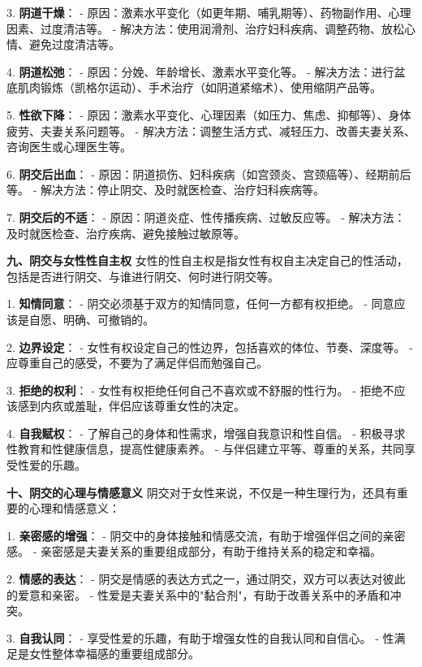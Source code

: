 \begin{enumerate}
  3. \textbf{阴道干燥}：
     - 原因：激素水平变化（如更年期、哺乳期等）、药物副作用、心理因素、过度清洁等。
     - 解决方法：使用润滑剂、治疗妇科疾病、调整药物、放松心情、避免过度清洁等。

  4. \textbf{阴道松弛}：
     - 原因：分娩、年龄增长、激素水平变化等。
     - 解决方法：进行盆底肌肉锻炼（凯格尔运动）、手术治疗（如阴道紧缩术）、使用缩阴产品等。

  5. \textbf{性欲下降}：
     - 原因：激素水平变化、心理因素（如压力、焦虑、抑郁等）、身体疲劳、夫妻关系问题等。
     - 解决方法：调整生活方式、减轻压力、改善夫妻关系、咨询医生或心理医生等。

  6. \textbf{阴交后出血}：
     - 原因：阴道损伤、妇科疾病（如宫颈炎、宫颈癌等）、经期前后等。
     - 解决方法：停止阴交、及时就医检查、治疗妇科疾病等。

  7. \textbf{阴交后的不适}：
     - 原因：阴道炎症、性传播疾病、过敏反应等。
     - 解决方法：及时就医检查、治疗疾病、避免接触过敏原等。

  \textbf{九、阴交与女性性自主权}
  女性的性自主权是指女性有权自主决定自己的性活动，包括是否进行阴交、与谁进行阴交、何时进行阴交等。

  1. \textbf{知情同意}：
     - 阴交必须基于双方的知情同意，任何一方都有权拒绝。
     - 同意应该是自愿、明确、可撤销的。

  2. \textbf{边界设定}：
     - 女性有权设定自己的性边界，包括喜欢的体位、节奏、深度等。
     - 应尊重自己的感受，不要为了满足伴侣而勉强自己。

  3. \textbf{拒绝的权利}：
     - 女性有权拒绝任何自己不喜欢或不舒服的性行为。
     - 拒绝不应该感到内疚或羞耻，伴侣应该尊重女性的决定。

  4. \textbf{自我赋权}：
     - 了解自己的身体和性需求，增强自我意识和性自信。
     - 积极寻求性教育和性健康信息，提高性健康素养。
     - 与伴侣建立平等、尊重的关系，共同享受性爱的乐趣。

  \textbf{十、阴交的心理与情感意义}
  阴交对于女性来说，不仅是一种生理行为，还具有重要的心理和情感意义：

  1. \textbf{亲密感的增强}：
     - 阴交中的身体接触和情感交流，有助于增强伴侣之间的亲密感。
     - 亲密感是夫妻关系的重要组成部分，有助于维持关系的稳定和幸福。

  2. \textbf{情感的表达}：
     - 阴交是情感的表达方式之一，通过阴交，双方可以表达对彼此的爱意和亲密。
     - 性爱是夫妻关系中的"黏合剂"，有助于改善关系中的矛盾和冲突。

  3. \textbf{自我认同}：
     - 享受性爱的乐趣，有助于增强女性的自我认同和自信心。
     - 性满足是女性整体幸福感的重要组成部分。


\end{enumerate}
